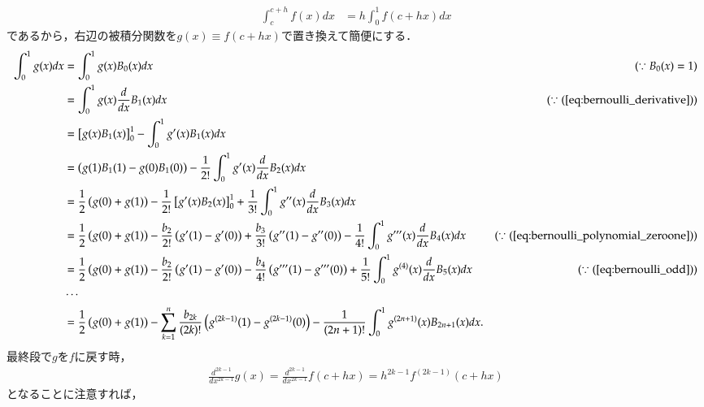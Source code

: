 \documentclass[a4j,papersize,disablejfam,slide,14pt]{jsarticle}
\begin{document}
    \begin{align}
    	\int_{c}^{c+h}f(x)dx &= h \int_{0}^{1} f(c+hx)dx
    \end{align}
    であるから，右辺の被積分関数を$g(x) \equiv f(c+hx)$で置き換えて簡便にする．
    \begin{align}
    	\int_{0}^{1} g(x) dx &= \int_{0}^{1} g(x) B_0(x)dx & (\because B_0(x)=1)\\
        &= \int_{0}^{1} g(x) \frac{d}{dx}B_1(x)dx & (\because (\refeq{eq:bernoulli_derivative})) \\
        &= \left[ g(x) B_1(x) \right]_{0}^{1} - \int_{0}^{1} g'(x) B_1(x)dx \\
        &= \left( g(1) B_1(1) - g(0) B_1(0) \right) - \frac{1}{2!} \int_{0}^{1} g'(x) \frac{d}{dx} B_2(x)dx \\
        &= \frac{1}{2} \left( g(0)+g(1) \right) - \frac{1}{2!} \left[ g'(x) B_2(x) \right]_{0}^{1} 
        	+ \frac{1}{3!} \int_{0}^{1} g''(x) \frac{d}{dx}B_3(x)dx \\
        &= \frac{1}{2} \left( g(0)+g(1) \right) - \frac{b_2}{2!} \left( g'(1) - g'(0) \right) 
        	+ \frac{b_3}{3!} \left( g''(1) - g''(0) \right) 
            - \frac{1}{4!} \int_{0}^{1} g'''(x) \frac{d}{dx} B_4(x)dx & (\because (\refeq{eq:bernoulli_polynomial_zeroone})) \\
        &= \frac{1}{2} \left( g(0)+g(1) \right) - \frac{b_2}{2!} \left( g'(1) - g'(0) \right)
            - \frac{b_4}{4!} \left( g'''(1) - g'''(0) \right) + \frac{1}{5!} \int_{0}^{1} g^{(4)}(x) \frac{d}{dx} B_5(x)dx & (\because (\refeq{eq:bernoulli_odd}))\\
        &\cdots \\
        &= \frac{1}{2} \left( g(0)+g(1) \right) 
        	- \sum_{k=1}^{n} \frac{b_{2k}}{(2k)!} \left( g^{(2k-1)}(1) - g^{(2k-1)}(0) \right)
            - \frac{1}{(2n+1)!} \int_{0}^{1} g^{(2n+1)}(x) B_{2n+1}(x)dx.
    \end{align}
    最終段で$g$を$f$に戻す時，
    \begin{align}
    	\frac{d^{2k-1}}{dx^{2k-1}} g(x) = \frac{d^{2k-1}}{dx^{2k-1}} f(c+hx) = h^{2k-1} f^{(2k-1)} (c+hx)
    \end{align}
    となることに注意すれば，
\end{document}
